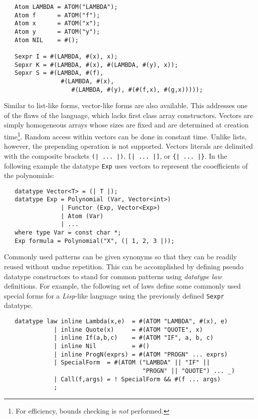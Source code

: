 \begin{verbatim}
   Atom LAMBDA = ATOM("LAMBDA");
   Atom f      = ATOM("f");
   Atom x      = ATOM("x");
   Atom y      = ATOM("y");
   Atom NIL    = #();
 
   Sexpr I = #(LAMBDA, #(x), x);
   Sepxr K = #(LAMBDA, #(x), #(LAMBDA, #(y), x));
   Sepxr S = #(LAMBDA, #(f),
                #(LAMBDA, #(x),
                   #(LAMBDA, #(y), #(#(f,x), #(g,x)))));
\end{verbatim}
 
Similar to list-like forms, vector-like forms are also available.
This addresses one of the flaws of the \Cpp{} language, which lacks
first class array constructors.  
Vectors are simply homogeneous arrays whose sizes
are fixed and are determined at creation time\footnote{For efficiency,
bounds checking is {\em not} performed.}.   Random access within
vectors can be done in constant time.  Unlike lists, however, the
prepending operation is not supported.   Vectors literals are delimited
with the composite brackets \verb!(| ... |)!, \verb![| ... |]!, or
\verb!{| ... |}!.  In the following example the datatype \verb|Exp|
uses vectors to represent the cooefficients of the polynomials:
 
\begin{verbatim}
   datatype Vector<T> = (| T |);
   datatype Exp = Polynomial (Var, Vector<int>)
                | Functor (Exp, Vector<Exp>)
                | Atom (Var)
                | ...
   where type Var = const char *;
   Exp formula = Polynomial("X", (| 1, 2, 3 |));
\end{verbatim}
 
Commonly used patterns can be given synonyms so that they can be readily
reused without undue repetition.  This can be accomplished by defining pseudo
datatype constructors to stand for common patterns using
{\em datatype law} definitions.  For example, the following set of
laws define some commonly used special forms for a {\em Lisp}-like language
using the previously defined \verb|Sexpr| datatype.
 
\begin{verbatim}
   datatype law inline Lambda(x,e)  = #(ATOM "LAMBDA", #(x), e)
              | inline Quote(x)     = #(ATOM "QUOTE", x)
              | inline If(a,b,c)    = #(ATOM "IF", a, b, c)
              | inline Nil          = #()
              | inline ProgN(exprs) = #(ATOM "PROGN" ... exprs)
              | SpecialForm  = #(ATOM ("LAMBDA" || "IF" ||
                                       "PROGN" || "QUOTE") ... _)
              | Call(f,args) = ! SpecialForm && #(f ... args)
              ;
\end{verbatim}
 
